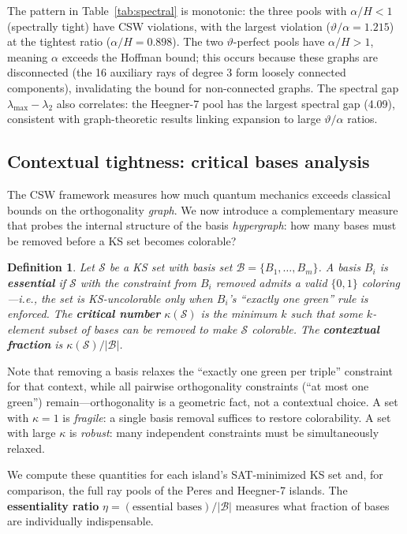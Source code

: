 \documentclass[12pt,a4paper]{article}
\newtheorem{definition}[theorem]{Definition}
\begin{document}
The pattern in Table~\ref{tab:spectral} is monotonic: the three pools with $\alpha/H < 1$ (spectrally tight) have CSW violations, with the largest violation ($\vartheta/\alpha = 1.215$) at the tightest ratio ($\alpha/H = 0.898$). The two $\vartheta$-perfect pools have $\alpha/H > 1$, meaning $\alpha$ exceeds the Hoffman bound; this occurs because these graphs are disconnected (the 16 auxiliary rays of degree 3 form loosely connected components), invalidating the bound for non-connected graphs. The spectral gap $\lambda_{\max} - \lambda_2$ also correlates: the Heegner-7 pool has the largest spectral gap (4.09), consistent with graph-theoretic results linking expansion to large $\vartheta/\alpha$ ratios.

\subsection{Contextual tightness: critical bases analysis}\label{sec:critical-bases}

The CSW framework measures how much quantum mechanics exceeds classical bounds on the orthogonality \emph{graph}. We now introduce a complementary measure that probes the internal structure of the basis \emph{hypergraph}: how many bases must be removed before a KS set becomes colorable?

\begin{definition}\label{def:essential-basis}
Let $\mathcal{S}$ be a KS set with basis set $\mathcal{B} = \{B_1, \ldots, B_m\}$. A basis $B_i$ is \textbf{essential} if $\mathcal{S}$ with the constraint from $B_i$ removed admits a valid $\{0,1\}$ coloring---i.e., the set is KS-uncolorable only when $B_i$'s ``exactly one green'' rule is enforced. The \textbf{critical number} $\kappa(\mathcal{S})$ is the minimum $k$ such that some $k$-element subset of bases can be removed to make $\mathcal{S}$ colorable. The \textbf{contextual fraction} is $\kappa(\mathcal{S}) / |\mathcal{B}|$.
\end{definition}

Note that removing a basis relaxes the ``exactly one green per triple'' constraint for that context, while all pairwise orthogonality constraints (``at most one green'') remain---orthogonality is a geometric fact, not a contextual choice. A set with $\kappa = 1$ is \emph{fragile}: a single basis removal suffices to restore colorability. A set with large $\kappa$ is \emph{robust}: many independent constraints must be simultaneously relaxed.

We compute these quantities for each island's SAT-minimized KS set and, for comparison, the full ray pools of the Peres and Heegner-7 islands. The \textbf{essentiality ratio} $\eta = (\text{essential bases}) / |\mathcal{B}|$ measures what fraction of bases are individually indispensable.
\end{document}
